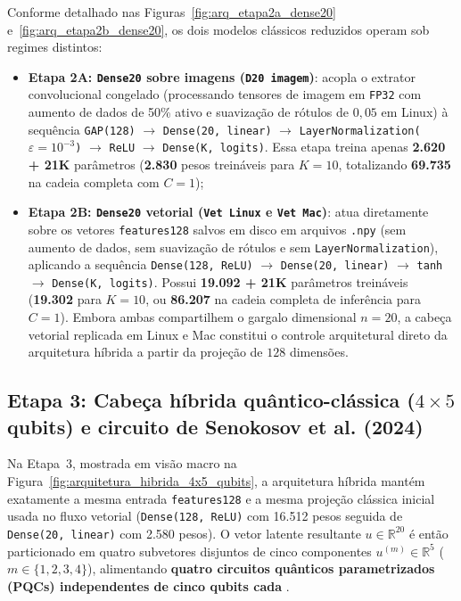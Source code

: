 \documentclass[
    12pt,
    openright,
    oneside,
    a4paper,
    english,
    brazil
]{abntex2}
\begin{document}
Conforme detalhado nas Figuras~\ref{fig:arq_etapa2a_dense20} e~\ref{fig:arq_etapa2b_dense20}, os dois modelos clássicos reduzidos operam sob regimes distintos:
\begin{itemize}
    \item \textbf{Etapa 2A: \texttt{Dense20} sobre imagens (\texttt{D20 imagem})}: acopla o extrator convolucional congelado (processando tensores de imagem em \texttt{FP32} com aumento de dados de 50\% ativo e suavização de rótulos de \(0{,}05\) em Linux) à sequência \texttt{GAP(128)} \(\rightarrow\) \texttt{Dense(20, linear)} \(\rightarrow\) \texttt{LayerNormalization(\(\varepsilon=10^{-3}\))} \(\rightarrow\) \texttt{ReLU} \(\rightarrow\) \texttt{Dense(K, logits)}. Essa etapa treina apenas \textbf{2.620 + 21K} parâmetros (\textbf{2.830} pesos treináveis para \(K=10\), totalizando \textbf{69.735} na cadeia completa com \(C=1\));
    \item \textbf{Etapa 2B: \texttt{Dense20} vetorial (\texttt{Vet Linux} e \texttt{Vet Mac})}: atua diretamente sobre os vetores \texttt{features128} salvos em disco em arquivos \texttt{.npy} (sem aumento de dados, sem suavização de rótulos e sem \texttt{LayerNormalization}), aplicando a sequência \texttt{Dense(128, ReLU)} \(\rightarrow\) \texttt{Dense(20, linear)} \(\rightarrow\) \texttt{tanh} \(\rightarrow\) \texttt{Dense(K, logits)}. Possui \textbf{19.092 + 21K} parâmetros treináveis (\textbf{19.302} para \(K=10\), ou \textbf{86.207} na cadeia completa de inferência para \(C=1\)). Embora ambas compartilhem o gargalo dimensional \(n=20\), a cabeça vetorial replicada em Linux e Mac constitui o controle arquitetural direto da arquitetura híbrida a partir da projeção de \(128\) dimensões.
\end{itemize}

\subsection{Etapa 3: Cabeça híbrida quântico-clássica (\texorpdfstring{\(4 \times 5\)}{4x5} qubits) e circuito de Senokosov et al. (2024)}

Na Etapa~3, mostrada em visão macro na Figura~\ref{fig:arquitetura_hibrida_4x5_qubits}, a arquitetura híbrida mantém exatamente a mesma entrada \texttt{features128} e a mesma projeção clássica inicial usada no fluxo vetorial (\texttt{Dense(128, ReLU)} com 16.512 pesos seguida de \texttt{Dense(20, linear)} com 2.580 pesos). O vetor latente resultante \(u \in \mathbb{R}^{20}\) é então particionado em quatro subvetores disjuntos de cinco componentes \(u^{(m)} \in \mathbb{R}^{5}\) (\(m \in \{1, 2, 3, 4\}\)), alimentando \textbf{quatro circuitos quânticos parametrizados (PQCs) independentes de cinco qubits cada} \cite{senokosov2024qml,cerezo2021variational,bergholm2018pennylane}.
\end{document}

